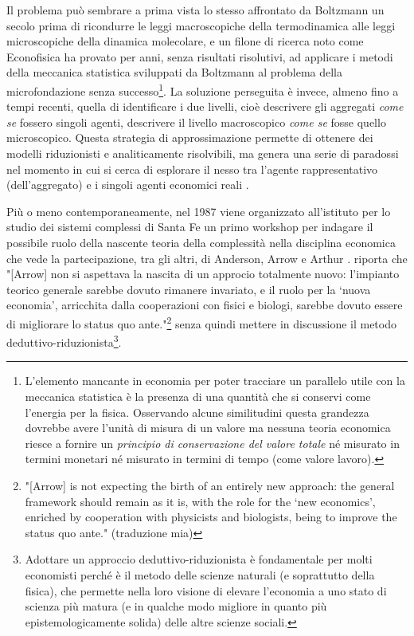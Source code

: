 \documentclass[a4paper, headings=standardclasses]{scrartcl}
\begin{document}
Il problema può sembrare a prima vista lo stesso affrontato da Boltzmann un secolo prima di ricondurre le leggi macroscopiche della termodinamica alle leggi microscopiche della dinamica molecolare, e un filone di ricerca noto come Econofisica ha provato per anni, senza risultati risolutivi, ad applicare i metodi della meccanica statistica sviluppati da Boltzmann al problema della microfondazione senza successo\footnote{L'elemento mancante in economia per poter tracciare un parallelo utile con la meccanica statistica è la presenza di una quantità che si conservi come l'energia per la fisica. Osservando alcune similitudini questa grandezza dovrebbe avere l'unità di misura di un valore ma nessuna teoria economica riesce a fornire un \textit{principio di conservazione del valore totale} né misurato in termini monetari né misurato in termini di tempo (come valore lavoro).}.
La soluzione perseguita è invece, almeno fino a tempi recenti, quella di identificare i due livelli, cioè descrivere gli aggregati \textit{come se} fossero singoli agenti, descrivere il livello macroscopico \textit{come se} fosse quello microscopico. Questa strategia di approssimazione permette di ottenere dei modelli riduzionisti e analiticamente risolvibili, ma genera una serie di paradossi nel momento in cui si cerca di esplorare il nesso tra l'agente rappresentativo (dell'aggregato) e i singoli agenti economici reali \parencite{kirman1992}.

Più o meno contemporaneamente, nel 1987 viene organizzato all'istituto per lo studio dei sistemi complessi di Santa Fe un primo workshop per indagare il possibile ruolo della nascente teoria della complessità nella disciplina economica che vede la partecipazione, tra gli altri, di Anderson, Arrow e Arthur \parencite{fontana2010a}.
\citeauthor{fontana2010a} riporta che "[Arrow] non si aspettava la nascita di un approcio totalmente nuovo: l'impianto teorico generale sarebbe dovuto rimanere invariato, e il ruolo per la `nuova economia', arricchita dalla cooperazioni con fisici e biologi, sarebbe dovuto essere di migliorare lo status quo ante."\footnote{"[Arrow] is not expecting the birth of an entirely new approach: the general framework should remain as it is, with the role for the `new economics', enriched by cooperation with physicists and biologists, being to improve the status quo ante." (traduzione mia)} \parencite{fontana2010a} senza quindi mettere in discussione il metodo deduttivo-riduzionista\footnote{Adottare un approccio deduttivo-riduzionista è fondamentale per molti economisti perché è il metodo delle scienze naturali (e soprattutto della fisica), che permette nella loro visione di elevare l'economia a uno stato di scienza più matura (e in qualche modo migliore in quanto più epistemologicamente solida) delle altre scienze sociali.}.
\end{document}
